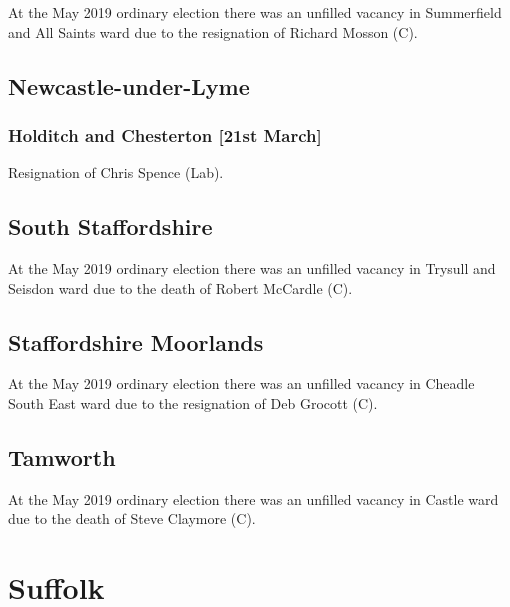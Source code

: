 \documentclass[a4paper,openany]{book}
\begin{document}
\begin{resultsiii}
At the May 2019 ordinary election there was an unfilled vacancy in Summerfield and All Saints ward due to the resignation of Richard Mosson (C).

\subsection*{Newcastle-under-Lyme}

\subsubsection*{Holditch and Chesterton \hspace*{\fill}\nolinebreak[1]%
	\enspace\hspace*{\fill}
	[21st March]}


Resignation of Chris Spence (Lab).

\subsection*{South Staffordshire}

At the May 2019 ordinary election there was an unfilled vacancy in Trysull and Seisdon ward due to the death of Robert McCardle (C).

\subsection*{Staffordshire Moorlands}

At the May 2019 ordinary election there was an unfilled vacancy in Cheadle South East ward due to the resignation of Deb Grocott (C).

\subsection*{Tamworth}

At the May 2019 ordinary election there was an unfilled vacancy in Castle ward due to the death of Steve Claymore (C).

\section{Suffolk}


\end{resultsiii}
\end{document}
